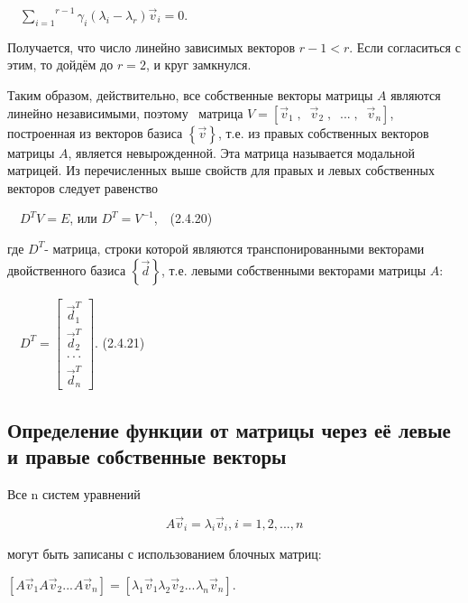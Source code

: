		\ \  $\overset{r-1}{\underset{i=1}{\sum }}γ_i(\lambda _i-\lambda _r)\vec v_i=0$.



		Получается, что число линейно зависимых векторов  $r-1<r$. Если согласиться с этим, то дойдём до  $r=2$, и круг
		замкнулся.



		Таким образом, действительно, все собственные векторы матрицы  $A$ являются линейно независимыми, поэтому \ матрица 
		$V=\left[\vec v_1\;,\;\;\vec v_2\;,\;\;...\;,\;\;\vec v_n\right]$, построенная из векторов базиса  $\left\{\vec
		v\right\}$, т.е. из правых собственных векторов матрицы $A$, является невырожденной. Эта матрица называется модальной
		матрицей. Из перечисленных выше свойств для правых и левых собственных векторов следует равенство



		\ \  $D^TV=E$, или  $D^T=V^{-1}$,\ \ (2.4.20)



		где  $D^T$- матрица, строки которой являются транспонированными векторами двойственного базиса  $\left\{\vec d\right\}$,
		т.е. левыми собственными векторами матрицы  $A$:



		\ \  $D^T=\left[\begin{matrix}\vec d_1^T\\\vec d_2^T\\\cdot \cdot \cdot \\\vec
		d_n^T\end{matrix}\right]$.  (2.4.21)



\bigskip

\subsection{Определение функции от матрицы через её левые и правые собственные векторы}

\bigskip


		Все n систем уравнений


\begin{equation*}
A\vec v_i=\lambda _i\vec v_i,_{}^{}i=1,2,...,n
\end{equation*}

		могут быть записаны с использованием блочных матриц:



		$[A\vec v_1^{}A\vec v_2^{}...^{}A\vec v_n]=[\lambda _1\vec v_1^{}\lambda _2\vec v_2^{}...^{}\lambda _n\vec v_n]$.



